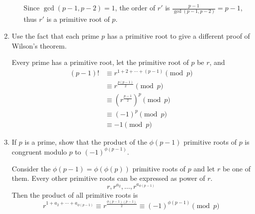 \documentclass[12pt]{exam}
\theoremstyle{definition}
\begin{document}
\begin{enumerate}
\begin{enumerate}
\begin{answer}
                  Since $\gcd(p-1, p-2) = 1$, the order of $r'$ is $\frac{p-1}{\gcd(p-1, p-2)} = p-1$, thus $r'$ is a primitive root of $p$.
            \end{answer}
      \end{enumerate}

      \setcounter{enumi}{9}
      \item Use the fact that each prime $p$ has a primitive root to give a different proof of Wilson's
      theorem.\newline
      [Hint: If $p$ has a primitive root $r$, then Theorem 8.4 implies that $(p - 1)! = r^{1+2+\cdots+(p-1)} \pmod p$.]
      \begin{answer}
            Every prime has a primitive root, let the primitive root of $p$ be $r$, and
            \[
                  \begin{aligned}
                        (p - 1)! &\equiv r^{1+2+\cdots+(p-1)} \pmod p \\
                        &\equiv r^{\frac{p(p-1)}{2}} \pmod p \\
                        &\equiv {(r^{\frac{p-1}{2}})}^p \pmod p \\
                        &\equiv {(-1)}^p \pmod p \\
                        &\equiv -1 \pmod p
                  \end{aligned}
            \]

      \end{answer}
      \item If $p$ is a prime, show that the product of the $\phi(p - 1)$ primitive roots of $p$ is congruent
      modulo $p$ to ${(-1)}^{\phi(p-1)}$.\newline
      [Hint: If $r$ is a primitive root of $p$, then the integer $r^k$ is a primitive root of $p$ provided
      that $\gcd(k, p - 1) = 1$; now use Theorem7.7.]

      \begin{answer}
            Consider the $\phi(p-1) = \phi(\phi(p))$ primitive roots of $p$ and let $r$ be one of them.
            Every other primitive roots can be expressed as power of $r$.
            \[
                  r, r^{a_2}, \dots, r^{a_{\phi(p-1)}}
            \]
            Then the product of all primitive roots is
            \[
                  r^{1+a_2+\cdots+a_{\phi(p-1)}} \equiv r^{\frac{\phi(p-1)(p-1)}{2}} \equiv {(-1)}^{\phi(p-1)} \pmod p
            \]
      \end{answer}

\end{enumerate}
\end{document}
